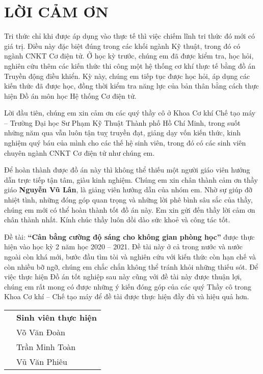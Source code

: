 \chapter*{LỜI CẢM ƠN}
Tri thức chỉ khi được áp dụng vào thực tế thì việc chiếm lĩnh tri thức đó mới có giá trị. Điều này đặc biệt đúng trong các khối ngành Kỹ thuật, trong đó có ngành CNKT Cơ điện tử. Ở học kỳ trước, chúng em đã được kiểm tra, học hỏi, nghiên cứu thêm các kiến thức thi công một hệ thống cơ khí thực tế bằng đồ án Truyền động điều khiển. Kỳ này, chúng em tiếp tục được học hỏi, áp dụng các kiến thức đã được học, đồng thời kiểm tra năng lực của bản thân bằng cách thực hiện Đồ án môn học Hệ thống Cơ điện tử.

Lời đầu tiên, chúng em xin cảm ơn các quý thầy cô ở Khoa Cơ khí Chế tạo máy – Trường Đại học Sư Phạm Kỹ Thuật Thành phố Hồ Chí Minh, trong suốt những năm qua vẫn luôn tận tuỵ truyền đạt, giảng dạy vốn kiến thức, kinh nghiệm quý báu của mình cho các thế hệ sinh viên, trong đó có các sinh viên chuyên ngành CNKT Cơ điện tử như chúng em.

Để hoàn thành được đồ án này thì không thể thiếu một người giáo viên hướng dẫn trực tiếp tận tâm, giàu kinh nghiệm. Chúng em xin chân thành cảm ơn thầy giáo \textbf{Nguyễn Vũ Lân}, là giảng viên hướng dẫn của nhóm em. Nhờ sự giúp đỡ nhiệt tình, những đóng góp quan trọng và những lời phê bình sâu sắc của thầy, chúng em mới có thể hoàn thành tốt đồ án này. Em xin gửi đến thầy lời cảm ơn chân thành nhất. Kính chúc thầy luôn dồi dào sức khoẻ và công tác tốt.

Đề tài: \textbf{“Cân bằng cường độ sáng cho không gian phòng học”} được thực hiện vào học kỳ 2 năm học 2020 – 2021. Đề tài này ở cả trong nước và nước ngoài còn khá mới, bước đầu tìm tòi và nghiên cứu với kiến thức còn hạn chế và còn nhiều bỡ ngỡ, chúng em chắc chắn không thể tránh khỏi những thiếu sót. Để việc thực hiện Đồ án tốt nghiệp sau này cũng với đề tài này được thuận lợi, chúng em rất mong có được những ý kiến đóng góp của các quý Thầy cô trong Khoa Cơ khí – Chế tạo máy để đề tài được thực hiện đầy đủ và hiệu quả hơn. 
\begin{center}
\begin{tabular}{w{c}{0.5\linewidth} w{c}{0.5\linewidth}}
 & \textbf{Sinh viên thực hiện} \\ 
 & Võ Văn Đoàn \\ 
 & Trần Minh Toàn \\ 
 & Vũ Văn Phiêu \\  
\end{tabular} 
\end{center}
